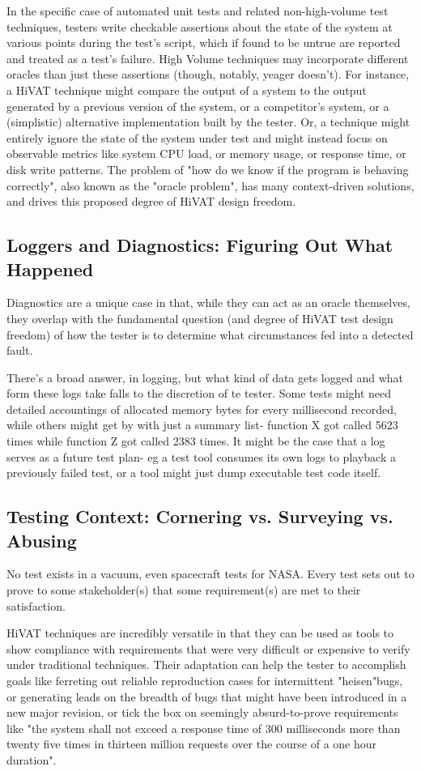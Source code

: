 In the specific case of automated unit tests and related non-high-volume test techniques, testers write checkable assertions about the state of the system at various points during the test's script, which if found to be untrue are reported and treated as a test's failure. High Volume techniques may incorporate different oracles than just these assertions (though, notably, yeager doesn't). For instance, a HiVAT technique might compare the output of a system to the output generated by a previous version of the system, or a competitor's system, or a (simplistic) alternative implementation built by the tester. Or, a technique might entirely ignore the state of the system under test and might instead focus on observable metrics like system CPU load, or memory usage, or response time, or disk write patterns. The problem of "how do we know if the program is behaving correctly", also known as the "oracle problem", has many context-driven solutions, and drives this proposed degree of HiVAT design freedom.

\subsection{Loggers and Diagnostics: Figuring Out What Happened}
Diagnostics are a unique case in that, while they can act as an oracle themselves, they overlap with the fundamental question (and degree of HiVAT test design freedom) of how the tester is to determine what circumstances fed into a detected fault.

There's a broad answer, in logging, but what kind of data gets logged and what form these logs take falls to the discretion of te tester. Some tests might need detailed accountings of allocated memory bytes for every millisecond recorded, while others might get by with just a summary list- function X got called 5623 times while function Z got called 2383 times. It might be the case that a log serves as a future test plan- eg a test tool consumes its own logs to playback a previously failed test, or a tool might just dump executable test code itself.

\subsection{Testing Context: Cornering vs. Surveying vs. Abusing}
No test exists in a vacuum, even spacecraft tests for NASA. Every test sets out to prove to some stakeholder(s) that some requirement(s) are met to their satisfaction.

HiVAT techniques are incredibly versatile in that they can be used as tools to show compliance with requirements that were very difficult or expensive to verify under traditional techniques. Their adaptation can help the tester to accomplish goals like ferreting out reliable reproduction cases for intermittent "heisen"bugs, or generating leads on the breadth of bugs that might have been introduced in a new major revision, or tick the box on seemingly absurd-to-prove requirements like "the system shall not exceed a response time of 300 milliseconds more than twenty five times in thirteen million requests over the course of a one hour duration".

